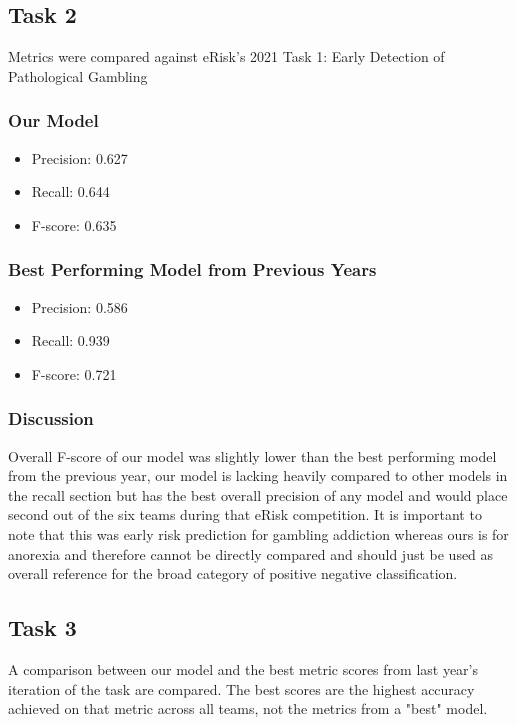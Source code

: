 \documentclass[12pt, titlepage]{article}
\begin{document}
\subsection{Task 2}
Metrics were compared against eRisk's 2021 Task 1: Early Detection of Pathological Gambling


\subsubsection{Our Model}
\begin{itemize}
   \item Precision: 0.627
   \item Recall: 0.644
   \item F-score: 0.635
\end{itemize}


\subsubsection{Best Performing Model from Previous Years}
\begin{itemize}
   \item Precision: 0.586
   \item Recall: 0.939
   \item F-score: 0.721
\end{itemize}


\subsubsection{Discussion}
Overall F-score of our model was slightly lower than the best performing model from the previous year, our model is lacking heavily compared to other models in the recall section but has the best overall precision of any model and would place second out of the six teams during that eRisk competition. It is important to note that this was early risk prediction for gambling addiction whereas ours is for anorexia and therefore cannot be directly compared and should just be used as overall reference for the broad category of positive negative classification.


\subsection{Task 3}
A comparison between our model and the best metric scores from last year's iteration of the task are compared. The best scores are the highest accuracy achieved on that metric across all teams, not the metrics from a "best" model.
\end{document}
